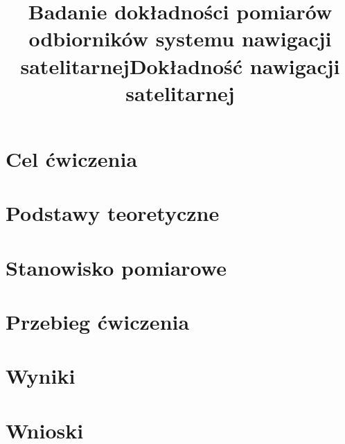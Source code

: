 \documentclass[theme = light]{sprawozdanie}
\title{Badanie dokładności pomiarów odbiorników systemu nawigacji satelitarnej}
\author{ }
\begin{document}
\maketitle
%
\title{Dokładność nawigacji satelitarnej}
%
%
\tableofcontents\hfill\vfill
%


%
\vfill

%
%
\newpage
\section{Cel ćwiczenia} \label{sec:podstawy}
    
\section{Podstawy teoretyczne}
    
\section{Stanowisko pomiarowe}
    
\newpage
\section{Przebieg ćwiczenia}
    
\section{Wyniki\label{sec:wyniki}}
    
\newpage
\section{Wnioski}
    
%
\end{document}
